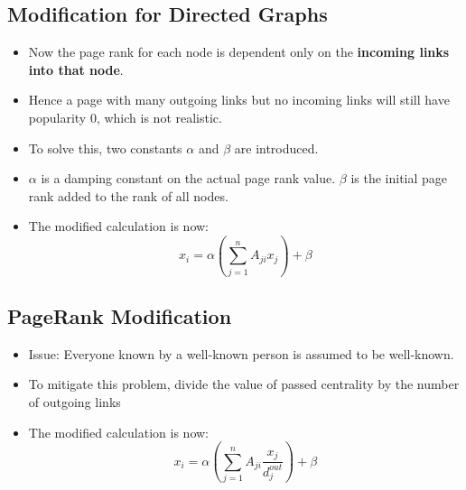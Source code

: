 \documentclass{article}
\begin{document}
\subsection{Modification for Directed Graphs}
\begin{itemize}
    \item Now the page rank for each node is dependent only on the \textbf{incoming links into that node}. 
    
    \item Hence a page with many outgoing links but no incoming links will still have popularity 0, which is not realistic. 
    
    \item To solve this, two constants $\alpha$ and $\beta$ are introduced. 
    
    \item $\alpha$ is a damping constant on the actual page rank value. $\beta$ is the initial page rank added to the rank of all nodes.
    
    \item The modified calculation is now:
    \begin{equation*}
        x_i = \alpha  \left( \sum_{j=1}^{n} A_{ji} x_j \right) + \beta
    \end{equation*}
\end{itemize}

\subsection{PageRank Modification}
\begin{itemize}
    \item Issue: Everyone known by a well-known person is assumed to be well-known.
    
    \item To mitigate this problem, divide the value of passed centrality by the number of outgoing links
    
    \item The modified calculation is now:
    \begin{equation*}
        x_i = \alpha  \left( \sum_{j=1}^{n} A_{ji} \frac{x_j}{d_j^{out}} \right) + \beta
    \end{equation*}
\end{itemize}
\end{document}

